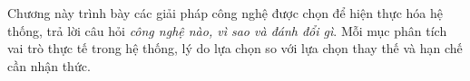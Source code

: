 \documentclass[../DoAn.tex]{subfiles}
\begin{document}
Chương này trình bày các giải pháp công nghệ được chọn để hiện thực hóa hệ thống, trả lời
câu hỏi \textit{công nghệ nào, vì sao và đánh đổi gì}. Mỗi mục phân tích vai trò thực tế
trong hệ thống, lý do lựa chọn so với lựa chọn thay thế và hạn chế cần nhận thức.



\end{document}
